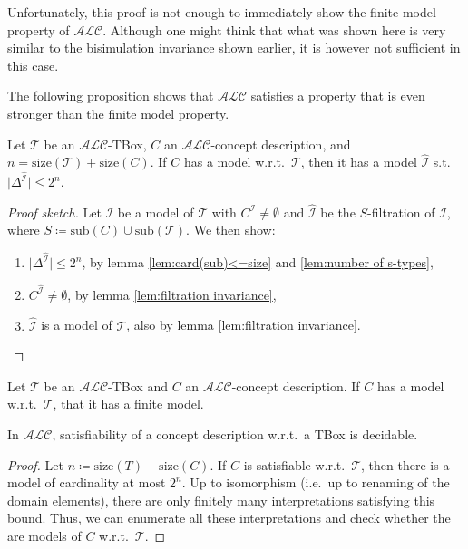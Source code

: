 Unfortunately, this proof is not enough to immediately show the finite model property of $\mathcal{ALC}$.
Although one might think that what was shown here is very similar to the bisimulation invariance shown earlier,
it is however not sufficient in this case.

The following proposition shows that $\mathcal{ALC}$ satisfies a property that is even stronger than the finite model property.
\begin{theorem}
	Let $\mathcal{T}$ be an $\mathcal{ALC}$-TBox, $C$ an $\mathcal{ALC}$-concept description, and $n = \text{size}(\mathcal{T}) + \text{size}(C)$.
	If $C$ has a model w.r.t.\ $\mathcal{T}$, then it has a model $\widehat{\mathcal{I}}$ s.t. $\lvert \Delta^{\widehat{\mathcal{I}}} \rvert \leq 2^n$.
\end{theorem}
\begin{proof}[Proof sketch]
	Let $\mathcal{I}$ be a model of $\mathcal{T}$ with $C^{\mathcal{I}} \neq \emptyset$ and $\widehat{\mathcal{I}}$ be the $S$-filtration of $\mathcal{I}$,
	where $S \coloneqq \text{sub}(C) \cup \text{sub}(\mathcal{T})$.
	We then show:
	\begin{enumerate}
		\item $\lvert \Delta^{\widehat{\mathcal{I}}} \rvert \leq 2^{n}$, by lemma \ref{lem:card(sub)<=size} and \ref{lem:number of s-types},
		\item $C^{\widehat{\mathcal{I}}} \neq \emptyset$, by lemma \ref{lem:filtration invariance},
		\item $\widehat{\mathcal{I}}$ is a model of $\mathcal{T}$, also by lemma \ref{lem:filtration invariance}.
	\end{enumerate}
\end{proof}

\begin{corollary}
	Let $\mathcal{T}$ be an $\mathcal{ALC}$-TBox and $C$ an $\mathcal{ALC}$-concept description.
	If $C$ has a model w.r.t.\ $\mathcal{T}$, that it has a finite model.
\end{corollary}

\begin{corollary}[Decidability]
	In $\mathcal{ALC}$, satisfiability of a concept description w.r.t.\ a TBox is decidable.
\end{corollary}
\begin{proof}
	Let $n \coloneqq \text{size}(T) + \text{size}(C)$.
	If $C$ is satisfiable w.r.t.\ $\mathcal{T}$, then there is a model of cardinality at most $2^{n}$.
	Up to isomorphism (i.e.\, up to renaming of the domain elements), there are only finitely many interpretations satisfying this bound.
	Thus, we can enumerate all these interpretations and check whether the are models of $C$ w.r.t.\ $\mathcal{T}$.
\end{proof}

